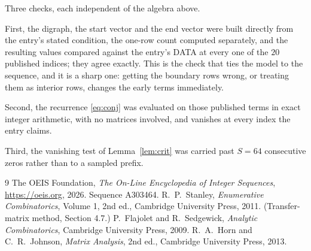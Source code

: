 \documentclass[11pt,a4paper]{article}
\theoremstyle{plain}
\theoremstyle{definition}
\begin{document}
Three checks, each independent of the algebra above.

First, the digraph, the start vector and the end vector were built directly from the
entry's stated condition, the one-row count computed separately, and the resulting values
compared against the entry's DATA at every one of the $20$ published indices; they
agree exactly. This is the check that ties the model to the sequence, and it is a sharp one:
getting the boundary rows wrong, or treating them as interior rows, changes the early terms
immediately.

Second, the recurrence \eqref{eq:conj} was evaluated on those published terms in exact
integer arithmetic, with no matrices involved, and vanishes at every index the entry claims.

Third, the vanishing test of Lemma~\ref{lem:crit} was carried past $S=64$ consecutive
zeros rather than to a sampled prefix.

\begin{thebibliography}{9}
 The OEIS Foundation, \emph{The On-Line Encyclopedia of Integer
Sequences}, \url{https://oeis.org}, 2026. Sequence A303464.
 R.~P.~Stanley, \emph{Enumerative Combinatorics}, Volume 1, 2nd ed.,
Cambridge University Press, 2011. (Transfer-matrix method, Section 4.7.)
 P.~Flajolet and R.~Sedgewick, \emph{Analytic Combinatorics}, Cambridge
University Press, 2009.
 R.~A.~Horn and C.~R.~Johnson, \emph{Matrix Analysis}, 2nd ed., Cambridge
University Press, 2013.
\end{thebibliography}
\end{document}
